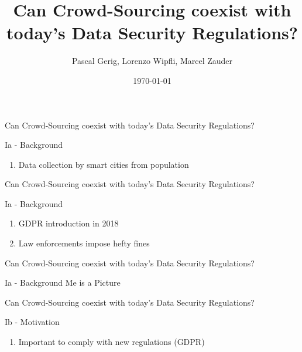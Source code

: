 \documentclass[12pt,aspectratio=169]{beamer}
\begin{document}
\author{Pascal Gerig, Lorenzo Wipfli, Marcel Zauder}
\newcommand{\TT}{Can Crowd-Sourcing coexist with today's Data Security Regulations?}
\newcommand{\TB}{Literature}
\newcommand{\BG}{Ia - Background}
\newcommand{\MO}{Ib - Motivation}
\newcommand{\RQ}{II - Problem Statement and Research Questions}
\newcommand{\MT}{III - Methodology}

\title{\TT}
\date{\today} 

\begin{frame}
\titlepage
\end{frame}

\LARGE

\begin{frame}{\TT}
	\begin{block}{\BG}
		\begin{enumerate}[-]
			\item Data collection by smart cities from population
		\end{enumerate}
	\end{block}
\end{frame}

\begin{frame}{\TT}
	\begin{block}{\BG}
		\begin{enumerate}[-]
			\item GDPR introduction in 2018
			\item Law enforcements impose hefty fines
		\end{enumerate}
	\end{block}
\end{frame}

\begin{frame}{\TT}
	\begin{block}{\BG}
		Me is a Picture
	\end{block}
\end{frame}

\begin{frame}{\TT}
	\begin{block}{\MO}
		\begin{enumerate}[-]
			\item Important to comply with new regulations (GDPR)
		\end{enumerate}
	\end{block}
\end{frame}
\end{document}
